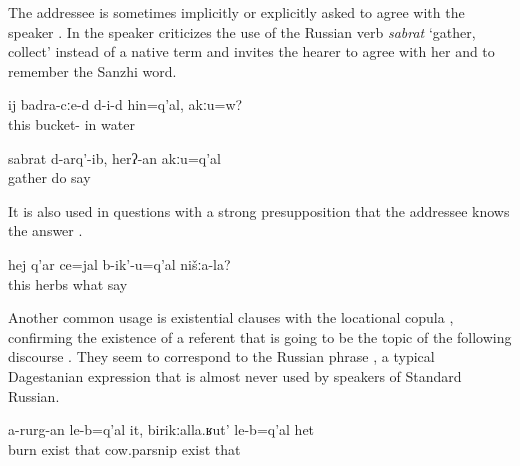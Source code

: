 The addressee is sometimes implicitly or explicitly asked to agree with the speaker . In  the speaker criticizes the use of the Russian verb \textit{sabrat} `gather, collect' instead of a native term and invites the hearer to agree with her and to remember the Sanzhi word.
%
\begin{exe}
	\ex	\label{ex:In this bucket is water, right minor}
	\gll	ij	badra-cːe-d	d-i-d	hin=q'al,	akːu=w?\\
		this	bucket-	in	water	\\
	\glt	{}

	\ex	\label{ex:Gather did, (we/you) don't say so minor}
	\gll	sabrat		d-arq'-ib,	herʔ-an	akːu=q'al\\
		gather	do	say	\\
	\glt	{}
\end{exe}

It is also used in questions with a strong presupposition that the addressee knows the answer .
%
\begin{exe}
	\ex	\label{ex:‎These herbs here, how are they called in our (language) minor}
	\gll	hej	q'ar	ce=jal	b-ik'-u=q'al	nišːa-la?\\
		this	herbs	what	say	\\
	\glt	{}
\end{exe}

Another common usage is existential clauses with the locational copula , confirming the existence of a referent that is going to be the topic of the following discourse . They seem to correspond to the Russian phrase , a typical Dagestanian expression that is almost never used by speakers of Standard Russian.
%
\begin{exe}
	\ex	\label{ex:There is the one that does not burn, the cow-parsnip minor}
	\gll	a-rurg-an	le-b=q'al	it,	birikːalla.ʁut'	le-b=q'al	het\\
		burn	exist	that	cow.parsnip	exist	that\\
	\glt	{}
\end{exe}

